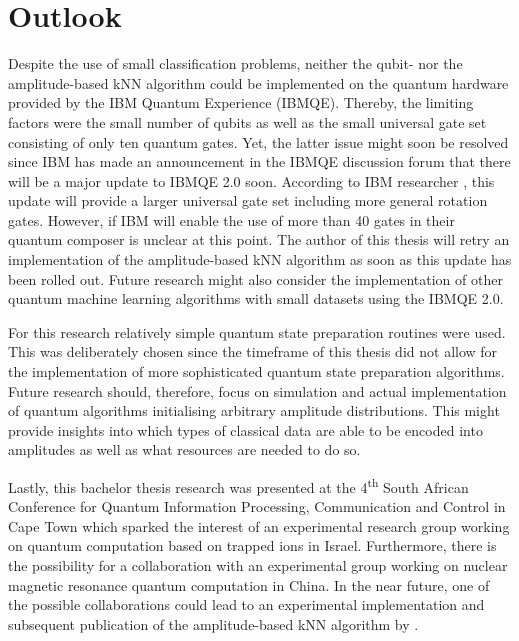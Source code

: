 \chapter{Outlook}\label{sec:outlook}

Despite the use of small classification problems, neither the qubit- nor the amplitude-based kNN algorithm could be implemented on the quantum hardware provided by the IBM Quantum Experience (IBMQE). Thereby, the limiting factors were the small number of qubits as well as the small universal gate set consisting of only ten quantum gates. Yet, the latter issue might soon be resolved since IBM has made an announcement in the IBMQE discussion forum that there will be a major update to IBMQE 2.0 soon. According to IBM researcher , this update will provide a larger universal gate set including more general rotation gates. However, if IBM will enable the use of more than 40 gates in their quantum composer is unclear at this point. The author of this thesis will retry an implementation of the amplitude-based kNN algorithm as soon as this update has been rolled out. Future research might also consider the implementation of other quantum machine learning algorithms with small datasets using the IBMQE 2.0.

For this research relatively simple quantum state preparation routines were used. This was deliberately chosen since the timeframe of this thesis did not allow for the implementation of more sophisticated quantum state preparation algorithms. Future research should, therefore, focus on simulation and actual implementation of quantum algorithms initialising arbitrary amplitude distributions. This might provide insights into which types of classical data are able to be encoded into amplitudes as well as what resources are needed to do so.

Lastly, this bachelor thesis research was presented at the 4\textsuperscript{th} South African Conference for Quantum Information Processing, Communication and Control in Cape Town which sparked the interest of an experimental research group working on quantum computation based on trapped ions in Israel. Furthermore, there is the possibility for a collaboration with an experimental group working on nuclear magnetic resonance quantum computation in China. In the near future, one of the possible collaborations could lead to an experimental implementation and subsequent publication of the amplitude-based kNN algorithm by .

